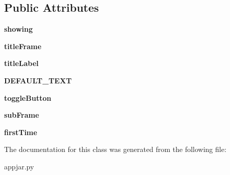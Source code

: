 \subsection*{Public Attributes}
\begin{DoxyCompactItemize}
\item 
\mbox{\label{class_python_01_g_u_i_1_1appjar_1_1_toggle_frame_a086d3bf51e0b828de049e3ecdd150038}} 
{\bfseries showing}
\item 
\mbox{\label{class_python_01_g_u_i_1_1appjar_1_1_toggle_frame_a1cee6d6001293e23fb27c4c503470e75}} 
{\bfseries title\+Frame}
\item 
\mbox{\label{class_python_01_g_u_i_1_1appjar_1_1_toggle_frame_a8a5b651bf458798d08c02fe207eb9d61}} 
{\bfseries title\+Label}
\item 
\mbox{\label{class_python_01_g_u_i_1_1appjar_1_1_toggle_frame_a2ad901f1f6c2e6f8e7990cab949d81fa}} 
{\bfseries D\+E\+F\+A\+U\+L\+T\+\_\+\+T\+E\+XT}
\item 
\mbox{\label{class_python_01_g_u_i_1_1appjar_1_1_toggle_frame_ac1f142feb3bed1e777ff40f36be71c8c}} 
{\bfseries toggle\+Button}
\item 
\mbox{\label{class_python_01_g_u_i_1_1appjar_1_1_toggle_frame_a9ceedc0daf5e93d015a373af24a627ee}} 
{\bfseries sub\+Frame}
\item 
\mbox{\label{class_python_01_g_u_i_1_1appjar_1_1_toggle_frame_a847d116ad3ca422838af58d7f725aba7}} 
{\bfseries first\+Time}
\end{DoxyCompactItemize}


The documentation for this class was generated from the following file\+:\begin{DoxyCompactItemize}
\item 
appjar.\+py\end{DoxyCompactItemize}
